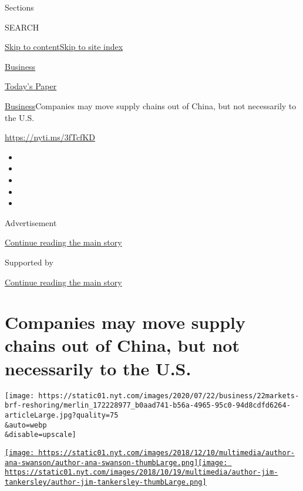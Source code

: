 Sections

SEARCH

\protect\hyperlink{site-content}{Skip to
content}\protect\hyperlink{site-index}{Skip to site index}

\href{https://www.nytimes.com/section/business}{Business}

\href{https://myaccount.nytimes.com/auth/login?response_type=cookie\&client_id=vi}{}

\href{https://www.nytimes.com/section/todayspaper}{Today's Paper}

\href{/section/business}{Business}\textbar{}Companies may move supply
chains out of China, but not necessarily to the U.S.

\url{https://nyti.ms/3fTcfKD}

\begin{itemize}
\item
\item
\item
\item
\item
\end{itemize}

Advertisement

\protect\hyperlink{after-top}{Continue reading the main story}

Supported by

\protect\hyperlink{after-sponsor}{Continue reading the main story}

\hypertarget{companies-may-move-supply-chains-out-of-china-but-not-necessarily-to-the-us}{%
\section{Companies may move supply chains out of China, but not
necessarily to the
U.S.}\label{companies-may-move-supply-chains-out-of-china-but-not-necessarily-to-the-us}}

\texttt{[image: https://static01.nyt.com/images/2020/07/22/business/22markets-brf-reshoring/merlin\_172228977\_b0aad741-b56a-4965-95c0-94d8cdfd6264-articleLarge.jpg?quality=75\\\&auto=webp\\\&disable=upscale]}

\href{https://www.nytimes.com/by/ana-swanson}{\texttt{[image: https://static01.nyt.com/images/2018/12/10/multimedia/author-ana-swanson/author-ana-swanson-thumbLarge.png]}}\href{https://www.nytimes.com/by/jim-tankersley}{\texttt{[image: https://static01.nyt.com/images/2018/10/19/multimedia/author-jim-tankersley/author-jim-tankersley-thumbLarge.png]}}


